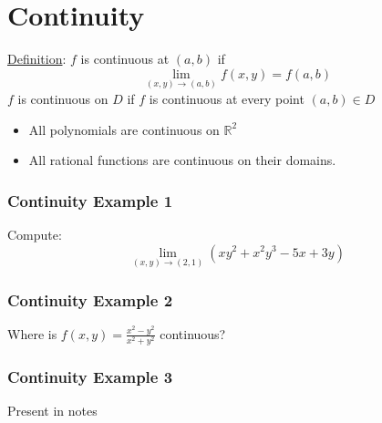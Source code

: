 \documentclass[12pt]{article}
\begin{document}
\section{Continuity}
\underline{Definition}: \(f\) is continuous at \((a,b)\) if \[
	\lim_{(x,y) \to (a,b)} f(x,y) = f(a,b)
\]
\(f\) is continuous on \(D\) if \(f\) is continuous at every point \((a,b) \in D\) 
\begin{itemize}
	\item All polynomials are continuous on \(\mathbb{R}^2\) 
	\item All rational functions are continuous on their domains.
\end{itemize}
\subsubsection{Continuity Example 1}
Compute: \[
	\lim_{(x,y) \to (2,1)} (xy^2+x^2y^3-5x+3y)
\]
\subsubsection{Continuity Example 2}
Where is \(f(x,y) = \frac{x^2-y^2}{x^2+y^2}\) continuous?
\subsubsection{Continuity Example 3}
	Present in notes
\end{document}
